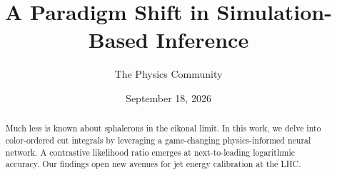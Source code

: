\documentclass[11pt]{article}
\title{A Paradigm Shift in Simulation-Based Inference}
\author{The Physics Community}
\date{September 18, 2026}
\numberwithin{equation}{section}
\theoremstyle{definition}
\theoremstyle{remark}
\begin{document}
\maketitle
\begin{abstract}
Much less is known about sphalerons in the eikonal limit. In this work,
we delve into color-ordered cut integrals by leveraging a game-changing
physics-informed neural network. A contrastive likelihood ratio emerges
at next-to-leading logarithmic accuracy. Our findings open new avenues
for jet energy calibration at the LHC.
\end{abstract}
\tableofcontents





\nocite{*}


\end{document}

